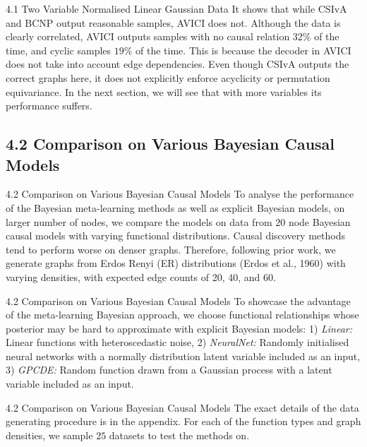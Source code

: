 \documentclass[aspectratio=169,10pt]{beamer}
\begin{document}
\begin{frame}{4.1 Two Variable Normalised Linear Gaussian Data}
\small
It shows that while CSIvA and BCNP output reasonable samples, AVICI does not. Although the data is clearly correlated, AVICI outputs samples with no causal relation $32\%$ of the time, and cyclic samples $19\%$ of the time. This is because the decoder in AVICI does not take into account edge dependencies. Even though CSIvA outputs the correct graphs here, it does not explicitly enforce acyclicity or permutation equivariance. In the next section, we will see that with more variables its performance suffers.
\end{frame}

\subsection{4.2 Comparison on Various Bayesian Causal Models}

\begin{frame}{4.2 Comparison on Various Bayesian Causal Models}
\small
To analyse the performance of the Bayesian meta-learning methods as well as explicit Bayesian models, on larger number of nodes, we compare the models on data from $20$ node Bayesian causal models with varying functional distributions. Causal discovery methods tend to perform worse on denser graphs. Therefore, following prior work, we generate graphs from Erdos Renyi (ER) distributions (Erdos et al., 1960) with varying densities, with expected edge counts of 20, 40, and 60.
\end{frame}

\begin{frame}{4.2 Comparison on Various Bayesian Causal Models}
\small
To showcase the advantage of the meta-learning Bayesian approach, we choose functional relationships whose posterior may be hard to approximate with explicit Bayesian models: 1) \textit{Linear:} Linear functions with heteroscedastic noise, 2) \textit{NeuralNet:} Randomly initialised neural networks with a normally distribution latent variable included as an input, 3) \textit{GPCDE:} Random function drawn from a Gaussian process with a latent variable included as an input.
\end{frame}

\begin{frame}{4.2 Comparison on Various Bayesian Causal Models}
The exact details of the data generating procedure is in the appendix. For each of the function types and graph densities, we sample $25$ datasets to test the methods on.
\end{frame}
\end{document}
